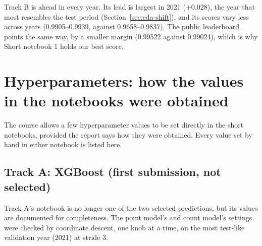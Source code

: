 \documentclass[11pt]{article}
\newcommand{\kagglelp}{0.99522}                        %
\newcommand{\kagglenn}{0.99024}                        %
\begin{document}
Track B is ahead in every year. Its lead is largest in 2021 ($+0.028$), the year that most resembles
the test period (Section~\ref{sec:eda-shift}), and its scores vary less across years (0.9905--0.9939, against
0.9658--0.9837). The public leaderboard points the same way, by a smaller margin (\kagglelp{} against \kagglenn{}),
which is why Short notebook 1 holds our best score.

\section{Hyperparameters: how the values in the notebooks were obtained}
\label{sec:r-hyper}

The course allows a few hyperparameter values to be set directly in the short notebooks, provided
the report says how they were obtained. Every value set by hand in either notebook is listed here.

\subsection{Track A: XGBoost (first submission, not selected)}

Track A's notebook is no longer one of the two selected predictions, but its values are documented
for completeness. The point model's and count model's settings were checked by coordinate descent, one knob at a time,
on the most test-like validation year (2021) at stride 3.
\end{document}
